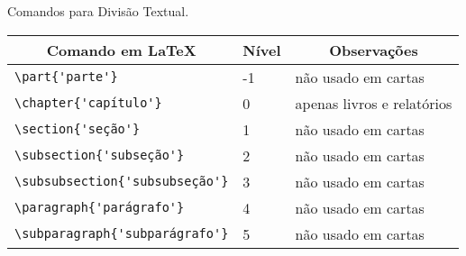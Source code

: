 \begin{quadro}[!htb]
    \centering
    \caption{Comandos para Divisão Textual.\label{qua:quadro-comandos-secoes}}
        \begin{tabular}{|l|l|l|}
            \hline
                \multicolumn{1}{|c|}{\textbf{Comando em \LaTeX{}}} & \multicolumn{1}{c|}{\textbf{Nível}} & \multicolumn{1}{c|}{\textbf{Observações}} \\ \hline
                \verb|\part{'parte'}|                              & -1                                  & não usado em cartas                        \\ \hline
                \verb|\chapter{'capítulo'}|                        & 0                                   & apenas livros e relatórios                  \\ \hline
                \verb|\section{'seção'}|                           & 1                                   & não usado em cartas                          \\ \hline
                \verb|\subsection{'subseção'}|                     & 2                                   & não usado em cartas                           \\ \hline
                \verb|\subsubsection{'subsubseção'}|               & 3                                   & não usado em cartas                            \\ \hline
                \verb|\paragraph{'parágrafo'}|                     & 4                                   & não usado em cartas                             \\ \hline
                \verb|\subparagraph{'subparágrafo'}|               & 5                                   & não usado em cartas                              \\ \hline
        \end{tabular}
\end{quadro}